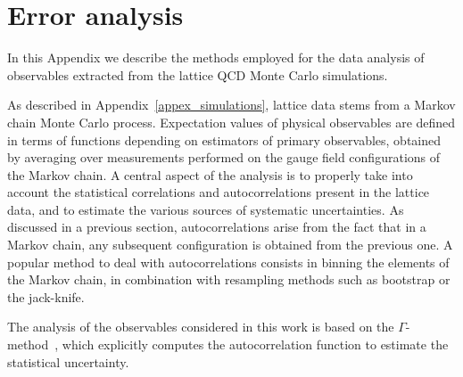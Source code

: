 
\chapter{Error analysis}
\label{appex_errors}

In this Appendix we describe the methods employed for the data analysis of
observables extracted
from the lattice QCD Monte Carlo simulations.

As described in Appendix~\ref{appex_simulations}, lattice data stems from a Markov chain Monte Carlo process. Expectation values of physical observables are defined in terms of functions depending on estimators of primary observables, obtained by averaging over measurements performed on the gauge field configurations of the Markov chain. A central aspect of the analysis is to properly take into account the statistical correlations and autocorrelations present in the lattice data, and to estimate the various sources of systematic uncertainties. As discussed in a previous section, autocorrelations arise from the fact that in a Markov chain, any subsequent configuration is obtained from the previous one. A popular method to deal with autocorrelations consists in binning the elements of the Markov chain, in combination with resampling methods such as bootstrap or the jack-knife.

The analysis of the observables considered in this work is based on the $\Gamma$-method~\citep{Wolff:2003sm,Schaefer:2010hu,Ramos:2018vgu}, which explicitly computes the autocorrelation function to estimate the statistical uncertainty.

